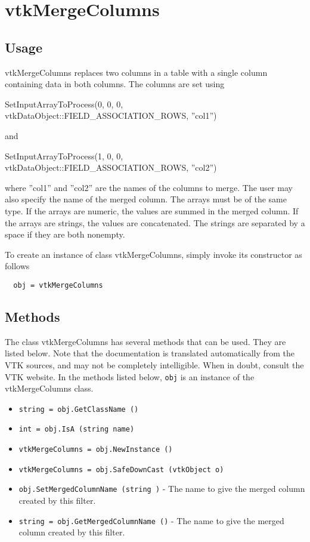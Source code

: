 \section{vtkMergeColumns}

\subsection{Usage}

 vtkMergeColumns replaces two columns in a table with a single column
 containing data in both columns.  The columns are set using

   SetInputArrayToProcess(0, 0, 0, vtkDataObject::FIELD\_ASSOCIATION\_ROWS, ''col1'')

 and

   SetInputArrayToProcess(1, 0, 0, vtkDataObject::FIELD\_ASSOCIATION\_ROWS, ''col2'')

 where ''col1'' and ''col2'' are the names of the columns to merge.
 The user may also specify the name of the merged column.
 The arrays must be of the same type.
 If the arrays are numeric, the values are summed in the merged column.
 If the arrays are strings, the values are concatenated.  The strings are
 separated by a space if they are both nonempty.

To create an instance of class vtkMergeColumns, simply
invoke its constructor as follows
\begin{verbatim}
  obj = vtkMergeColumns
\end{verbatim}
\subsection{Methods}

The class vtkMergeColumns has several methods that can be used.
  They are listed below.
Note that the documentation is translated automatically from the VTK sources,
and may not be completely intelligible.  When in doubt, consult the VTK website.
In the methods listed below, \verb|obj| is an instance of the vtkMergeColumns class.
\begin{itemize}
\item  \verb|string = obj.GetClassName ()|

\item  \verb|int = obj.IsA (string name)|

\item  \verb|vtkMergeColumns = obj.NewInstance ()|

\item  \verb|vtkMergeColumns = obj.SafeDownCast (vtkObject o)|

\item  \verb|obj.SetMergedColumnName (string )| -  The name to give the merged column created by this filter.

\item  \verb|string = obj.GetMergedColumnName ()| -  The name to give the merged column created by this filter.

\end{itemize}
